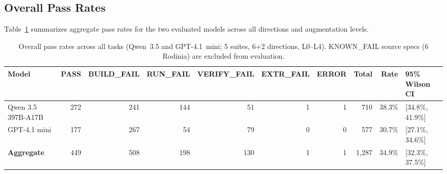 \documentclass[conference]{IEEEtran}
\newcommand{\buildfail}{\textsc{BUILD\_FAIL}}
\newcommand{\runfail}{\textsc{RUN\_FAIL}}
\newcommand{\verifyfail}{\textsc{VERIFY\_FAIL}}
\begin{document}
\subsection{Overall Pass Rates}
\label{sec:overall-pass}

Table~\ref{tab:overall-pass} summarizes aggregate pass rates for the two evaluated models across all directions and augmentation levels.

\begin{table}[t]
\centering
\caption{Overall pass rates across all tasks (Qwen~3.5 and GPT-4.1~mini; 5 suites, 6+2 directions, L0--L4). KNOWN\_FAIL source specs (6 Rodinia) are excluded from evaluation.}
\label{tab:overall-pass}
\small
\begin{tabular}{@{}lrrrrrrrrl@{}}
\toprule
Model & PASS & \buildfail & \runfail{} & \verifyfail{} & EXTR\_FAIL & ERROR & Total & Rate & 95\% Wilson CI \\
\midrule
Qwen 3.5 397B-A17B & 272 & 241 & 144 & 51 & 1 & 1 & 710 & 38.3\% & [34.8\%, 41.9\%] \\ %
GPT-4.1 mini & 177 & 267 & 54 & 79 & 0 & 0 & 577 & 30.7\% & [27.1\%, 34.6\%] \\ %
\textbf{Aggregate} & 449 & 508 & 198 & 130 & 1 & 1 & 1{,}287 & 34.9\% & [32.3\%, 37.5\%] \\ %
\bottomrule
\end{tabular}
\end{table}
\end{document}
